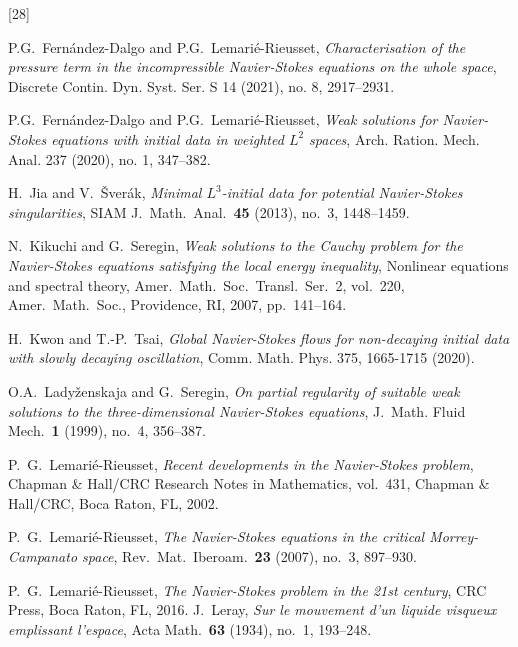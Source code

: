 \documentclass[11pt]{article}
\numberwithin{equation}{section}
\theoremstyle{remark}
\theoremstyle{definition}
\begin{document}
\begin{thebibliography}{[28]}
%
%

%

 P.G.~Fern\'andez-Dalgo and P.G.~Lemari\'e-Rieusset,
\textit{Characterisation of the pressure term in the incompressible Navier-Stokes equations on the whole space},
Discrete Contin. Dyn. Syst. Ser. S 14 (2021), no. 8, 2917–2931.


   P.G.~Fern\'andez-Dalgo and P.G.~Lemari\'e-Rieusset,
   \emph{Weak solutions for Navier-Stokes equations with initial data in weighted $L^2$ spaces},
 Arch. Ration. Mech. Anal. 237 (2020), no. 1, 347–382.
%
%
%
%

%
%
%
%
%
%
%
%
H.~Jia and V.~\v{S}ver\'{a}k, \emph{Minimal {$L^3$}-initial data for potential {N}avier-{S}tokes singularities},
  SIAM J.~Math.\ Anal.~\textbf{45} (2013), no.~3, 1448--1459.
%
%
%
%
%

  N.~Kikuchi and G.~Seregin,
  \emph{Weak solutions to the {C}auchy problem for the {N}avier-{S}tokes equations satisfying the local energy inequality},
  Nonlinear equations and spectral theory, Amer.\ Math.\ Soc.\ Transl.\ Ser.~2, vol.~220, Amer.\ Math.\ Soc., Providence, RI, 2007, pp.~141--164.
%
%
%
%
%

%
%
%
%
%
%
%
%
%
%

  H.~Kwon and T.-P.~Tsai,
  \emph{Global Navier-Stokes flows for non-decaying initial data with slowly decaying oscillation},  Comm. Math. Phys. 375, 1665-1715 (2020).
%

 O.A.~Lady{\v{z}}enskaja and G.~Seregin,
  \emph{On partial regularity of suitable weak solutions to the three-dimensional {N}avier-{S}tokes equations},
  J.~Math. Fluid Mech.~\textbf{1} (1999), no.~4, 356--387.
%
%
%
%
%

%

P.~G.~Lemari{\'e}-Rieusset,
  \emph{Recent developments in the Navier-Stokes problem},
  Chapman \& Hall/CRC Research Notes in Mathematics, vol.~431, Chapman \& Hall/CRC, Boca Raton, FL, 2002.


%

P.~G.~Lemari\'{e}-Rieusset,
  \emph{The {N}avier-{S}tokes equations in the critical {M}orrey-{C}ampanato space},
  Rev.\ Mat.\ Iberoam.~\textbf{23} (2007), no.~3, 897--930.


P.~G.~Lemari\'e-Rieusset,
  \emph{The {N}avier-{S}tokes problem in the
  21st century}, CRC Press, Boca Raton, FL, 2016.
%
  J.~Leray, \emph{Sur le mouvement d'un liquide visqueux emplissant l'espace},
  Acta Math.~\textbf{63} (1934), no.~1, 193--248.
%



\end{thebibliography}
\end{document}
